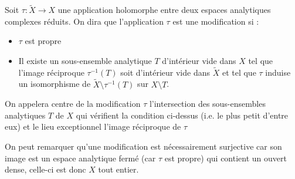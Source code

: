 \documentclass[a4page,10pt]{article}
\begin{document}
\begin{Def}
  Soit $\tau : \widetilde{X} \to X$ une application holomorphe entre deux espaces analytiques complexes r\'eduits. On dira que l'application $\tau$ est une modification si :
  \begin{itemize}
  \item $\tau$ est propre
    \item Il existe un sous-ensemble analytique $T$ d'int\'erieur vide dans $X$ tel que l'image r\'eciproque $\tau^{-1}(T)$ soit d'int\'erieur vide dans $\widetilde{X}$ et tel que $\tau$ induise un isomorphisme de $\widetilde{X}\setminus \tau^{-1}(T)$ sur $X \setminus T$.
    \end{itemize}
On appelera centre de la modification $\tau$ l'intersection des sous-ensembles analytiques $T$ de $X$ qui v\'erifient la condition ci-dessus (i.e. le plus petit d'entre eux) et le lieu exceptionnel l'image r\'eciproque de $\tau$
\end{Def}

On peut remarquer qu'une modification est n\'ecessairement surjective car son image est un espace analytique ferm\'e (car $\tau$ est propre) qui contient un ouvert dense, celle-ci est donc $X$ tout entier.
\end{document}
